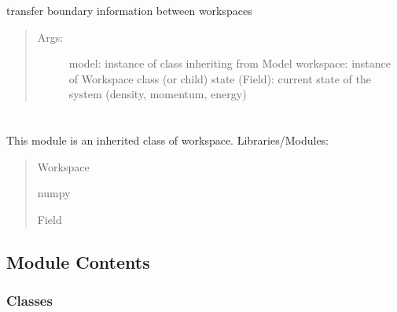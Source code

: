 \documentclass[letterpaper,10pt,english]{sphinxmanual}
\begin{document}
\begin{fulllineitems}
\begin{fulllineitems}
\label{\detokenize{autoapi/BoundaryConditioner/index:BoundaryConditioner.BoundaryConditioner.transfer_down}}
\sphinxAtStartPar
transfer boundary information between workspaces
\begin{quote}
\begin{description}
\item[{Args:}] \leavevmode
\sphinxAtStartPar
model: instance of class inheriting from Model
workspace: instance of Workspace class (or child)
state (Field): current state of the system (density, momentum, energy)

\end{description}
\end{quote}

\end{fulllineitems}


\end{fulllineitems}



\section{}
\label{\detokenize{autoapi/CellCenterWS/index:module-CellCenterWS}}\label{\detokenize{autoapi/CellCenterWS/index:cellcenterws}}\label{\detokenize{autoapi/CellCenterWS/index::doc}}
\sphinxAtStartPar
This module is an inherited class of workspace.
Libraries/Modules:
\begin{quote}

\sphinxAtStartPar
Workspace

\sphinxAtStartPar
numpy

\sphinxAtStartPar
Field
\end{quote}


\subsection{Module Contents}
\label{\detokenize{autoapi/CellCenterWS/index:module-contents}}

\subsubsection{Classes}
\label{\detokenize{autoapi/CellCenterWS/index:classes}}
\end{document}

